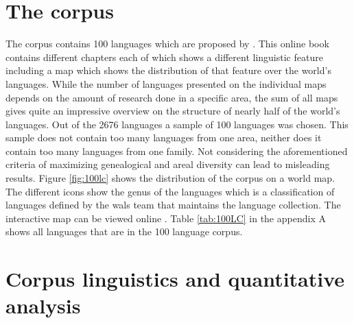 \label{chap:background}

\section{The corpus}
\label{corpus}
The corpus contains 100 languages which are proposed by \citet{Comrie&Dryer.2013}. This online book contains different chapters each of which shows a different linguistic feature including a map which shows the distribution of that feature over the world's languages. While the number of languages presented on the individual maps depends on the amount of research done in a specific area, the sum of all maps gives quite an impressive overview on the structure of nearly half of the world's languages. Out of the 2676 languages a sample of 100 languages was chosen. This sample does not contain too many languages from one area, neither does it contain too many languages from one family. Not considering the aforementioned criteria of maximizing genealogical and areal diversity can lead to misleading results. Figure \ref{fig:100lc} shows the distribution of the corpus on a world map. The different icons show the genus of the languages which is a classification of languages defined by the \ac{wals} team that maintains the language collection. The interactive map can be viewed online \citep{100LC.21.07.2021}. Table \ref{tab:100LC} in the appendix A shows all languages that are in the 100 language corpus. 


\section{Corpus linguistics and quantitative analysis}

